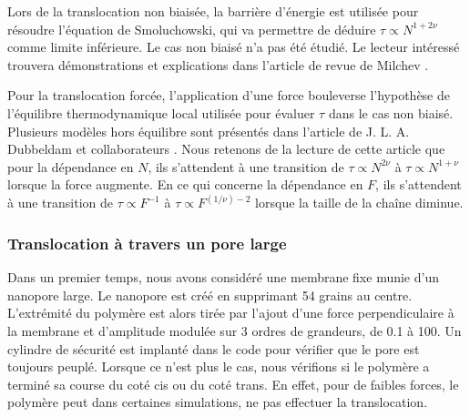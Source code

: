\documentclass[a4paper,11pt]{article}
\begin{document}
 Lors de la translocation non biaisée, la barrière d'énergie est utilisée pour résoudre l'équation de Smoluchowski, qui va permettre de déduire $\tau \propto N^{1+2\nu}$ comme limite inférieure. Le cas non biaisé n'a pas été étudié. Le lecteur intéressé trouvera démonstrations et explications dans l'article de revue de Milchev \cite{milchev}.
 
 Pour la translocation forcée, l'application d'une force bouleverse l'hypothèse de l'équilibre thermodynamique local utilisée pour évaluer $\tau$ dans le cas non biaisé. Plusieurs modèles hors équilibre sont présentés dans l'article de J. L. A. Dubbeldam et collaborateurs \cite{traction}. Nous retenons de la lecture de cette article que pour la dépendance en $N$, ils s'attendent à une transition de $\tau \propto N^{2\nu}$ à $\tau \propto N^{1+\nu}$ lorsque la force augmente. En ce qui concerne la dépendance en $F$, ils s'attendent à une transition de $\tau \propto F^{-1}$ à $\tau \propto F^{(1/\nu)-2}$ lorsque la taille de la chaîne diminue.



\subsubsection*{Translocation à travers un pore large}

Dans un premier temps, nous avons considéré une membrane fixe munie d'un nanopore large. Le nanopore est créé en supprimant 54 grains au centre. L'extrémité du polymère est alors tirée par l'ajout d'une force perpendiculaire à la membrane et d'amplitude modulée sur 3 ordres de grandeurs, de 0.1 à 100. Un cylindre de sécurité est implanté dans le code pour vérifier que le pore est toujours peuplé. Lorsque ce n'est plus le cas, nous vérifions si le polymère a terminé sa course du coté cis ou du coté trans. En effet, pour de faibles forces, le polymère peut dans certaines simulations, ne pas effectuer la translocation.\\
\end{document}
